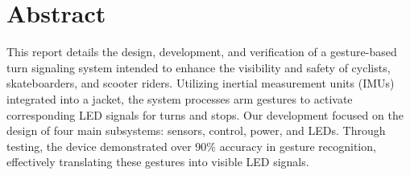 \section*{Abstract} %

This report details the design, development, and verification of a gesture-based turn signaling system intended to enhance the visibility and safety of cyclists, skateboarders, and scooter riders. Utilizing inertial measurement units (IMUs) integrated into a jacket, the system processes arm gestures to activate corresponding LED signals for turns and stops. Our development focused on the design of four main subsystems: sensors, control, power, and LEDs. Through testing, the device demonstrated over 90\% accuracy in gesture recognition, effectively translating these gestures into visible LED signals. 